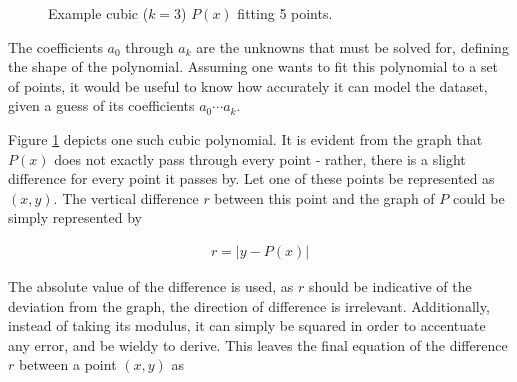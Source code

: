\documentclass[12pt, a4paper]{article}
\begin{document}
\begin{figure}
    \centering
    \caption{
        Example cubic ($k=3$) $P(x)$ fitting 5 points.
    }
    \label{fig1}
\end{figure}

The coefficients $a_0$ through $a_k$ are the unknowns that must be solved for,
defining the shape of the polynomial. Assuming one wants to fit this polynomial
to a set of points, it would be useful to know how accurately it can model the
dataset, given a guess of its coefficients $a_0 \cdots a_k$.

Figure \ref{fig1} depicts one such cubic polynomial. It is evident from the
graph that $P(x)$ does not exactly pass through every point - rather, there is a
slight difference for every point it passes by. Let one of these points be
represented as $(x, y)$. The vertical difference $r$ between this point and the
graph of $P$ could be simply represented by

\begin{align*}
    r=|y-P(x)|
\end{align*}

The absolute value of the difference is used, as $r$ should be indicative of the
deviation from the graph, the direction of difference is irrelevant.
Additionally, instead  of taking its modulus, it can simply be squared in order
to accentuate any error, and be wieldy to derive.  This leaves the final
equation of the difference $r$ between a point $(x, y)$ as
\end{document}
